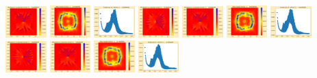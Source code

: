 \documentclass[11pt]{article}
\begin{document}
\includegraphics[width=0.11875\textwidth]{frame0084fig3.png}
\includegraphics[width=0.11875\textwidth]{frame0085fig0.png}
\includegraphics[width=0.11875\textwidth]{frame0085fig1.png}
\includegraphics[width=0.11875\textwidth]{frame0085fig2.png}
\includegraphics[width=0.11875\textwidth]{frame0085fig3.png}
\vskip 10pt 
\includegraphics[width=0.11875\textwidth]{frame0086fig0.png}
\includegraphics[width=0.11875\textwidth]{frame0086fig1.png}
\includegraphics[width=0.11875\textwidth]{frame0086fig2.png}
\includegraphics[width=0.11875\textwidth]{frame0086fig3.png}
\includegraphics[width=0.11875\textwidth]{frame0087fig0.png}
\includegraphics[width=0.11875\textwidth]{frame0087fig1.png}
\end{document}
